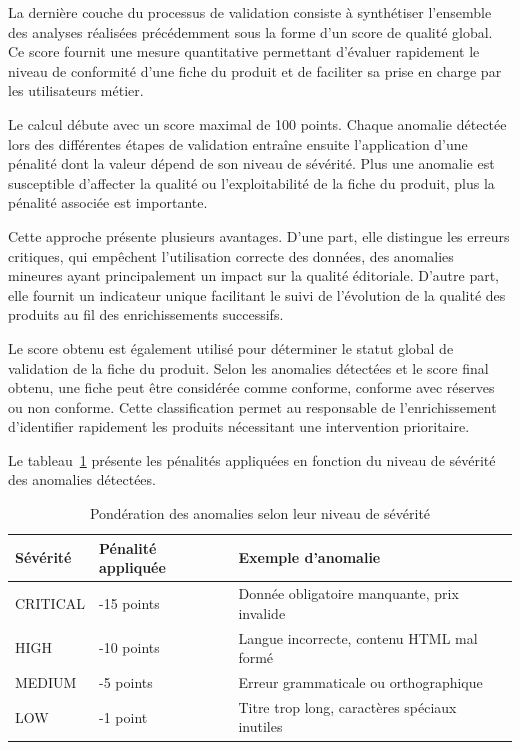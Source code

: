 La dernière couche du processus de validation consiste à synthétiser l'ensemble des analyses réalisées précédemment sous la forme d'un score de qualité global. Ce score fournit une mesure quantitative permettant d'évaluer rapidement le niveau de conformité d'une fiche du produit et de faciliter sa prise en charge par les utilisateurs métier.

Le calcul débute avec un score maximal de 100 points. Chaque anomalie détectée lors des différentes étapes de validation entraîne ensuite l'application d'une pénalité dont la valeur dépend de son niveau de sévérité. Plus une anomalie est susceptible d'affecter la qualité ou l'exploitabilité de la fiche du produit, plus la pénalité associée est importante.

Cette approche présente plusieurs avantages. D'une part, elle distingue les erreurs critiques, qui empêchent l'utilisation correcte des données, des anomalies mineures ayant principalement un impact sur la qualité éditoriale. D'autre part, elle fournit un indicateur unique facilitant le suivi de l'évolution de la qualité des produits au fil des enrichissements successifs.

Le score obtenu est également utilisé pour déterminer le statut global de validation de la fiche du produit. Selon les anomalies détectées et le score final obtenu, une fiche peut être considérée comme conforme, conforme avec réserves ou non conforme. Cette classification permet au responsable de l'enrichissement d'identifier rapidement les produits nécessitant une intervention prioritaire.

Le tableau~\ref{tab:ponderation_anomalies} présente les pénalités appliquées en fonction du niveau de sévérité des anomalies détectées.

\begin{table}[H]
\centering
\caption{Pondération des anomalies selon leur niveau de sévérité}
\label{tab:ponderation_anomalies}
\begin{tabular}{|p{3cm}|p{4cm}|p{7cm}|}
\hline
\textbf{Sévérité} & \textbf{Pénalité appliquée} & \textbf{Exemple d'anomalie} \\
\hline
CRITICAL & -15 points & Donnée obligatoire manquante, prix invalide \\
\hline
HIGH & -10 points & Langue incorrecte, contenu HTML mal formé \\
\hline
MEDIUM & -5 points & Erreur grammaticale ou orthographique \\
\hline
LOW & -1 point & Titre trop long, caractères spéciaux inutiles \\
\hline
\end{tabular}
\end{table}

